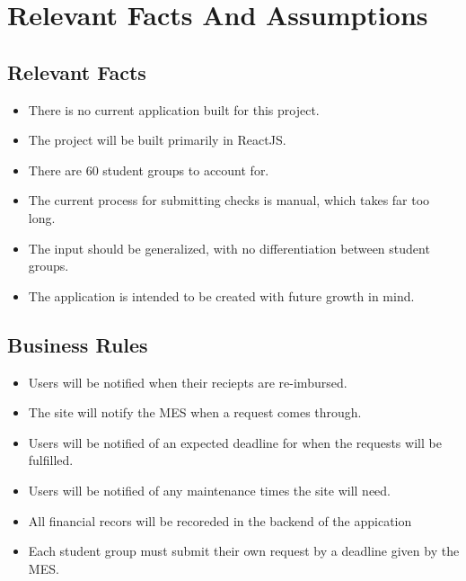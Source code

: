 \documentclass[12pt]{article}
\begin{document}
\section{Relevant Facts And Assumptions}
\subsection{Relevant Facts}
\begin{itemize}
  \item There is no current application built for this project.
  \item The project will be built primarily in ReactJS.
  \item There are 60 student groups to account for.
  \item The current process for submitting checks is manual, which takes far too long.
  \item The input should be generalized, with no differentiation between student groups.
  \item The application is intended to be created with future growth in mind.
\end{itemize}



\subsection{Business Rules}
\begin{itemize}
  \item Users will be notified when their reciepts are re-imbursed.
  \item The site will notify the MES when a request comes through.
  \item Users will be notified of an expected deadline for when the requests will be fulfilled.
  \item Users will be notified of any maintenance times the site will need.
  \item All financial recors will be recoreded in the backend of the appication 
  \item Each student group must submit their own request by a deadline given by the MES.
\end{itemize}
\end{document}
